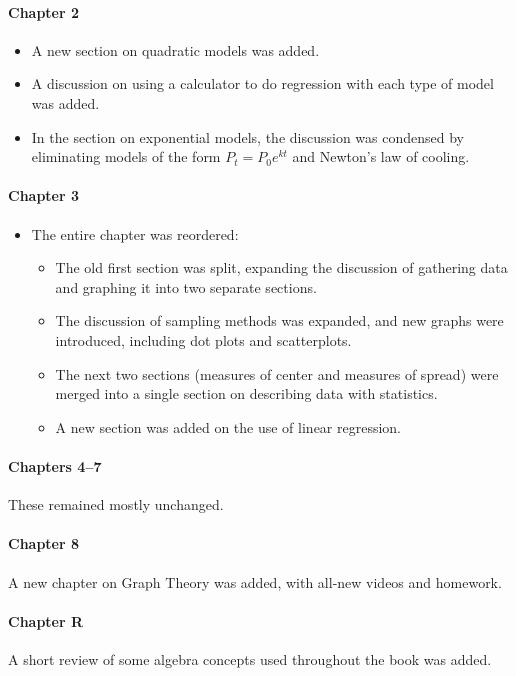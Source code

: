 \paragraph{Chapter 2}
\begin{itemize}
\item A new section on quadratic models was added.
\item A discussion on using a calculator to do regression with each type of model was added.
\item In the section on exponential models, the discussion was condensed by eliminating models of the form $P_t = P_0e^{kt}$ and Newton's law of cooling.
\end{itemize}

\paragraph{Chapter 3}
\begin{itemize}
\item The entire chapter was reordered:
\begin{itemize}
\item The old first section was split, expanding the discussion of gathering data and graphing it into two separate sections.
\item The discussion of sampling methods was expanded, and new graphs were introduced, including dot plots and scatterplots.
\item The next two sections (measures of center and measures of spread) were merged into a single section on describing data with statistics.
\item A new section was added on the use of linear regression.
\end{itemize}
\end{itemize}

\paragraph{Chapters 4--7} These remained mostly unchanged.

\paragraph{Chapter 8} A new chapter on Graph Theory was added, with all-new videos and homework.

\paragraph{Chapter R} A short review of some algebra concepts used throughout the book was added.